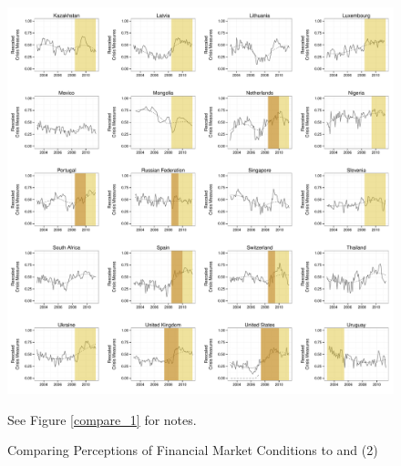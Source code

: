 \documentclass[]{article}
\begin{document}
\begin{figure}
    \caption{Comparing Perceptions of Financial Market Conditions to \cite{laeven2013} and \cite{Reinhart2009} (2)}
    \label{compare_2}
    \begin{center}
        \includegraphics[scale=0.4]{figures/compare_to_lv_rr_2.pdf}
    \end{center}

    {\tiny{See Figure \ref{compare_1} for notes.}}
\end{figure}
\end{document}

